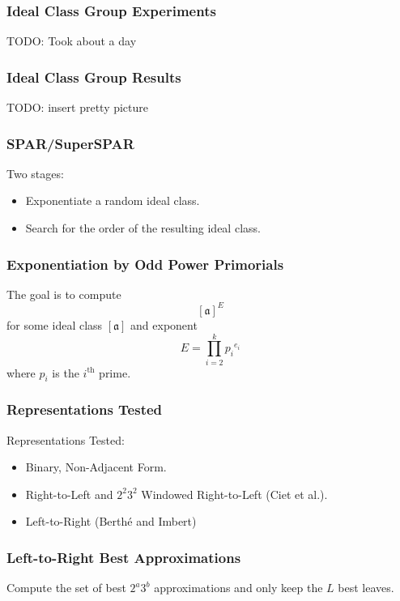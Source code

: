 \documentclass{beamer}
\newcommand{\ideal}{\mathfrak}
\newcommand{\idealclass}[1]{\left[ \ideal #1 \right]}
\newcommand{\aclass}{\idealclass a}
\newcommand{\ith}{i^{\textrm{th}}}
\begin{document}
\begin{frame}
\frametitle{Ideal Class Group Experiments}
TODO: Took about a day
\end{frame}

\begin{frame}
\frametitle{Ideal Class Group Results}
TODO: insert pretty picture
\end{frame}

\begin{frame}
\frametitle{SPAR/SuperSPAR}
Two stages:
\begin{itemize}
\item Exponentiate a random ideal class.
\item Search for the order of the resulting ideal class.
\end{itemize}
\end{frame}

\begin{frame}
\frametitle{Exponentiation by Odd Power Primorials}
The goal is to compute
\[
\aclass ^ E
\]
for some ideal class $\aclass$ and exponent
\[
	E = \prod_{i=2}^k {p_i}^{e_i}
\]
where $p_i$ is the $\ith$ prime.
\end{frame}

\begin{frame}
\frametitle{Representations Tested}
Representations Tested:
\begin{itemize}
\item Binary, Non-Adjacent Form.
\item Right-to-Left and $2^2 3^2$ Windowed Right-to-Left (Ciet et al.).
\item Left-to-Right (Berth{\'e} and Imbert)
\end{itemize}
\end{frame}

\begin{frame}
\frametitle{Left-to-Right Best Approximations}
Compute the set of best $2^a3^b$ approximations and only keep the $L$ best leaves.
\end{frame}
\end{document}
